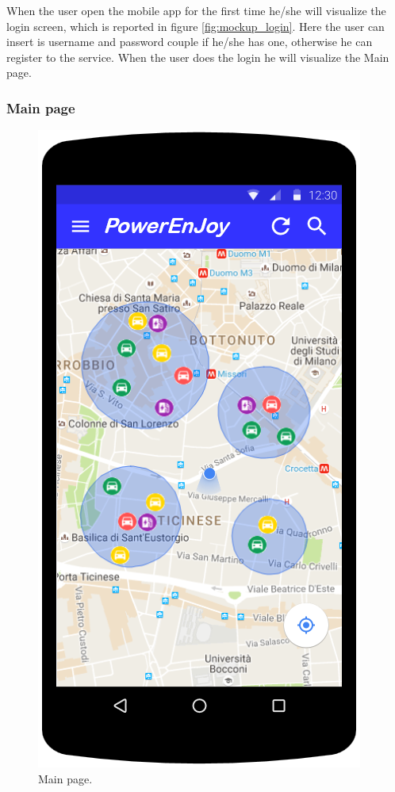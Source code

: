 When the user open the mobile app for the first time he/she will visualize the login screen, which is reported in figure \ref{fig:mockup_login}. Here the user can insert is username and password couple if he/she has one, otherwise he can register to the service. When the user does the login he will visualize the Main page.

\subsubsection*{Main page}

\begin{figure}
	\centering
	\includegraphics[width=\textwidth,height=\dimexpr\textheight-4\baselineskip-\abovecaptionskip-\belowcaptionskip\relax,keepaspectratio]{overall_description/mockup/main_page.png}
	\caption{Main page.}
	\label{fig:mockup_main_page}
\end{figure}

